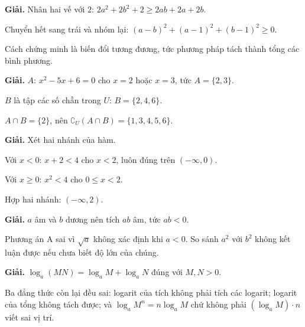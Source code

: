 \documentclass[11pt, a4paper]{article}
\begin{document}
\vspace{0.3cm}
\begin{dapan}[36 — Đáp án C]

\textbf{Giải.} Nhân hai vế với $2$: $2a^2 + 2b^2 + 2 \ge 2ab + 2a + 2b$.

Chuyển hết sang trái và nhóm lại: $(a-b)^2 + (a-1)^2 + (b-1)^2 \ge 0$.

Cách chứng minh là biến đổi tương đương, tức phương pháp tách thành tổng các bình phương.


\end{dapan}
\vspace{0.3cm}
\begin{dapan}[37 — Đáp án A]

\textbf{Giải.} $A$: $x^2 - 5x + 6 = 0$ cho $x = 2$ hoặc $x = 3$, tức $A = \{2,3\}$.

$B$ là tập các số chẵn trong $U$: $B = \{2,4,6\}$.

$A \cap B = \{2\}$, nên $\complement_U (A \cap B) = \{1,3,4,5,6\}$.


\end{dapan}
\vspace{0.3cm}
\begin{dapan}[38 — Đáp án D]

\textbf{Giải.} Xét hai nhánh của hàm.

Với $x < 0$: $x + 2 < 4$ cho $x < 2$, luôn đúng trên $(-\infty,0)$.

Với $x \ge 0$: $x^2 < 4$ cho $0 \le x < 2$.

Hợp hai nhánh: $(-\infty, 2)$.


\end{dapan}
\vspace{0.3cm}
\begin{dapan}[39 — Đáp án B]

\textbf{Giải.} $a$ âm và $b$ dương nên tích $ab$ âm, tức $ab < 0$.

Phương án A sai vì $\sqrt{a}$ không xác định khi $a < 0$. So sánh $a^2$ với $b^2$ không kết luận được nếu chưa biết độ lớn của chúng.


\end{dapan}
\vspace{0.3cm}
\begin{dapan}[40 — Đáp án D]

\textbf{Giải.} $\log_a(MN) = \log_a M + \log_a N$ đúng với $M, N > 0$.

Ba đẳng thức còn lại đều sai: logarit của tích không phải tích các logarit; logarit của tổng không tách được; và $\log_a M^n = n\log_a M$ chứ không phải $(\log_a M) \cdot n$ viết sai vị trí.


\end{dapan}
\end{document}
